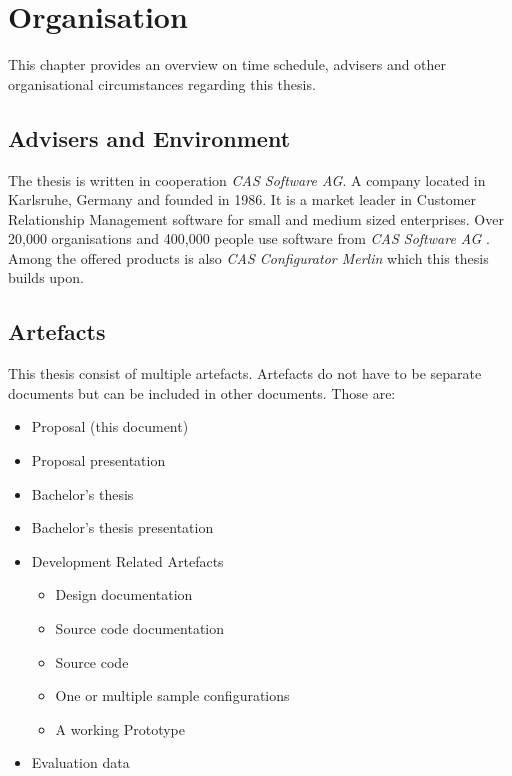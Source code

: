 \chapter{Organisation}
\label{ch:Organisation}


This chapter provides an overview on time schedule, advisers and other organisational circumstances regarding this thesis.

\section{Advisers and Environment}
\label{sec:Organisation:AdvisersAndEnvironment}

The thesis is written in cooperation \emph{CAS Software AG}. A company located in Karlsruhe, Germany and founded in 1986. It is a market leader in Customer Relationship Management software for small and medium sized enterprises. Over 20,000 organisations and 400,000 people use software from \emph{CAS Software AG} \cite{CASSoftwareAG}. Among the offered products is also \emph{CAS Configurator Merlin} which this thesis builds upon.


\section{Artefacts}
\label{sec:Organisation:Artefacts}

This thesis consist of multiple artefacts. Artefacts do not have to be separate documents but can be included in other documents. Those are:
\begin{itemize}
    \item Proposal (this document)
    \item Proposal presentation
    \item Bachelor's thesis
    \item Bachelor's thesis presentation
    \item Development Related Artefacts
    \begin{itemize}
        \item Design documentation
        \item Source code documentation
        \item Source code
        \item One or multiple sample configurations
        \item A working Prototype
    \end{itemize}
    \item Evaluation data
\end{itemize}

